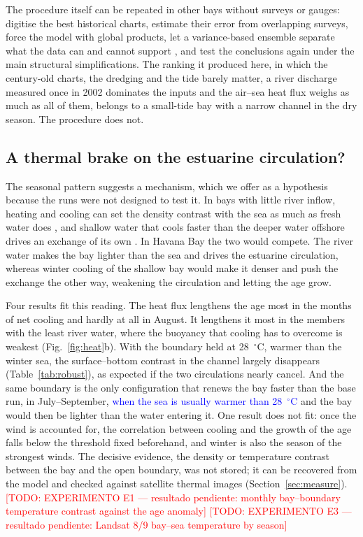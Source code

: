 \documentclass[a4paper,fleqn]{ems-dc}
\newcommand{\todo}[1]{\textcolor{red}{[TODO: #1]}}
\newcommand{\prov}[1]{\textcolor{blue}{#1}}
\begin{document}
The procedure itself can be repeated in other bays without surveys or gauges: digitise the
best historical charts, estimate their error from overlapping surveys, force the model with
global products, let a variance-based ensemble separate what the data can and cannot support
\citep{Pianosi2016,Razavi2021}, and test the conclusions again under the main structural
simplifications. The ranking it produced here, in which the century-old charts, the dredging
and the tide barely matter, a river discharge measured once in 2002 dominates the inputs and
the air--sea heat flux weighs as much as all of them, belongs to a small-tide bay with a
narrow channel in the dry season. The procedure does not.

\subsection{A thermal brake on the estuarine circulation?}\label{sec:disc-thermal}
The seasonal pattern suggests a mechanism, which we offer as a hypothesis because the runs
were not designed to test it. In bays with little river inflow, heating and cooling can set
the density contrast with the sea as much as fresh water does \citep{Largier2010}, and
shallow water that cools faster than the deeper water offshore drives an exchange of its own
\citep{Monismith2006,Doda2022}. In Havana Bay the two would compete. The river water makes the
bay lighter than the sea and drives the estuarine circulation, whereas winter cooling of the
shallow bay would make it denser and push the exchange the other way, weakening the
circulation and letting the age grow.

Four results fit this reading. The heat flux lengthens the age most in the months of net
cooling and hardly at all in August. It lengthens it most in the members with the least river
water, where the buoyancy that cooling has to overcome is weakest (Fig.~\ref{fig:heat}b).
With the boundary held at 28~$^\circ$C, warmer than the winter sea, the surface--bottom
contrast in the channel largely disappears (Table~\ref{tab:robust}), as expected if the two
circulations nearly cancel. And the same boundary is the only configuration that renews the
bay faster than the base run, in July--September, \prov{when the sea is usually warmer than
28~$^\circ$C} and the bay would then be lighter than the water entering it. One result does
not fit: once the wind is accounted for, the correlation between cooling and the growth of
the age falls below the threshold fixed beforehand, and winter is also the season of the
strongest winds. The decisive evidence, the density or temperature contrast between the bay
and the open boundary, was not stored; it can be recovered from the model and checked against
satellite thermal images (Section~\ref{sec:measure}). \todo{EXPERIMENTO E1 --- resultado
pendiente: monthly bay--boundary temperature contrast against the age anomaly}
\todo{EXPERIMENTO E3 --- resultado pendiente: Landsat 8/9 bay--sea temperature by season}
\end{document}
